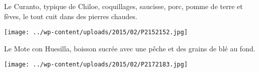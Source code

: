 \pagebreak
 Le Curanto, typique de Chiloe, coquillages, saucisse, porc, pomme de terre et fèves, le tout cuit dans des pierres chaudes.
 \begin{center} \texttt{[image: ../wp-content/uploads/2015/02/P2152152.jpg]} \end{center}

 Le Mote con Huesilla, boisson sucrée avec une pêche et des grains de blé au fond.
\begin{center} \texttt{[image: ../wp-content/uploads/2015/02/P2172183.jpg]} \end{center}